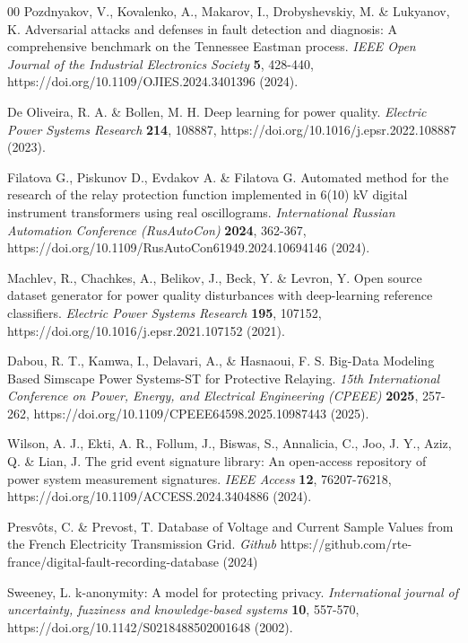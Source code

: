 \documentclass{article}
\begin{document}
\begin{thebibliography}{00}
 Pozdnyakov, V., Kovalenko, A., Makarov, I., Drobyshevskiy, M. \& Lukyanov, K. Adversarial attacks and defenses in fault detection and diagnosis: A comprehensive benchmark on the Tennessee Eastman process. \emph{IEEE Open Journal of the Industrial Electronics Society} \textbf{5}, 428-440, https://doi.org/10.1109/OJIES.2024.3401396 (2024).

 De Oliveira, R. A. \& Bollen, M. H. Deep learning for power quality. \emph{Electric Power Systems Research} \textbf{214}, 108887, https://doi.org/10.1016/j.epsr.2022.108887 (2023).

 Filatova G., Piskunov D., Evdakov A. \& Filatova G. Automated method for the research of the relay protection function implemented in 6(10) kV digital instrument transformers using real oscillograms. \emph{International Russian Automation Conference (RusAutoCon)} \textbf{2024}, 362-367, https://doi.org/10.1109/RusAutoCon61949.2024.10694146 (2024).

 Machlev, R., Chachkes, A., Belikov, J., Beck, Y. \& Levron, Y. Open source dataset generator for power quality disturbances with deep-learning reference classifiers. \emph{Electric Power Systems Research} \textbf{195}, 107152, https://doi.org/10.1016/j.epsr.2021.107152 (2021).

 Dabou, R. T., Kamwa, I., Delavari, A., \& Hasnaoui, F. S. Big-Data Modeling Based Simscape Power Systems-ST for Protective Relaying. \emph{15th International Conference on Power, Energy, and Electrical Engineering (CPEEE)} \textbf{2025}, 257-262, https://doi.org/10.1109/CPEEE64598.2025.10987443 (2025).

 Wilson, A. J., Ekti, A. R., Follum, J., Biswas, S., Annalicia, C., Joo, J. Y., Aziz, Q. \& Lian, J. The grid event signature library: An open-access repository of power system measurement signatures. \emph{IEEE Access} \textbf{12}, 76207-76218, https://doi.org/10.1109/ACCESS.2024.3404886 (2024).

 Presvôts, C. \& Prevost, T. Database of Voltage and Current Sample Values from the French Electricity Transmission Grid. \emph{Github} https://github.com/rte-france/digital-fault-recording-database (2024)

 Sweeney, L. k-anonymity: A model for protecting privacy. \emph{International journal of uncertainty, fuzziness and knowledge-based systems} \textbf{10}, 557-570, https://doi.org/10.1142/S0218488502001648 (2002).


\end{thebibliography}
\end{document}
